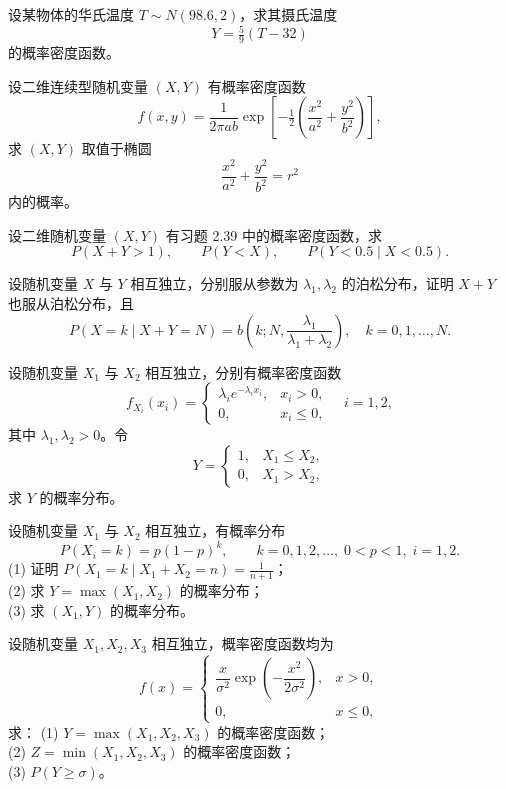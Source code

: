 \begin{homework}[2.45]
设某物体的华氏温度 $T \sim N(98.6, 2)$，求其摄氏温度
\[
Y = \tfrac{5}{9}(T - 32)
\]
的概率密度函数。
\end{homework}

\begin{homework}[2.50]
设二维连续型随机变量 $(X,Y)$ 有概率密度函数
\[
f(x,y) = \frac{1}{2\pi ab} \exp \!\left[ -\tfrac{1}{2} \!\left( \frac{x^2}{a^2} + \frac{y^2}{b^2} \right) \right],
\]
求 $(X,Y)$ 取值于椭圆
\[
\frac{x^2}{a^2} + \frac{y^2}{b^2} = r^2
\]
内的概率。
\end{homework}

\begin{homework}[2.53]
设二维随机变量 $(X,Y)$ 有习题 2.39 中的概率密度函数，求
\[
P(X+Y > 1),\qquad P(Y < X),\qquad P(Y < 0.5 \mid X < 0.5).
\]
\end{homework}

\begin{homework}[2.56]
设随机变量 $X$ 与 $Y$ 相互独立，分别服从参数为 $\lambda_1,\lambda_2$ 的泊松分布，证明 $X+Y$ 也服从泊松分布，且
\[
P(X = k \mid X+Y = N)
 = b\!\left(k;N,\frac{\lambda_1}{\lambda_1+\lambda_2}\right),
\quad k=0,1,\ldots,N.
\]
\end{homework}

\begin{homework}[2.52]
设随机变量 $X_1$ 与 $X_2$ 相互独立，分别有概率密度函数
\[
f_{X_i}(x_i)=
\begin{cases}
\lambda_i e^{-\lambda_i x_i}, & x_i > 0,\\[4pt]
0, & x_i \le 0,
\end{cases}
\quad i=1,2,
\]
其中 $\lambda_1,\lambda_2>0$。令
\[
Y =
\begin{cases}
1, & X_1 \le X_2,\\
0, & X_1 > X_2,
\end{cases}
\]
求 $Y$ 的概率分布。
\end{homework}

\begin{homework}[2.57]
设随机变量 $X_1$ 与 $X_2$ 相互独立，有概率分布
\[
P(X_i = k) = p(1-p)^k,\qquad k = 0,1,2,\ldots,\; 0<p<1,\; i=1,2.
\]
(1) 证明 $P(X_1=k \mid X_1+X_2=n)=\frac{1}{n+1}$；\\
(2) 求 $Y = \max(X_1,X_2)$ 的概率分布；\\
(3) 求 $(X_1,Y)$ 的概率分布。
\end{homework}

\begin{homework}[2.60]
设随机变量 $X_1,X_2,X_3$ 相互独立，概率密度函数均为
\[
f(x)=
\begin{cases}
\dfrac{x}{\sigma^2}\exp\!\left(-\dfrac{x^2}{2\sigma^2}\right), & x>0,\\
0, & x\le0,
\end{cases}
\]
求：  
(1) $Y=\max(X_1,X_2,X_3)$ 的概率密度函数；\\
(2) $Z=\min(X_1,X_2,X_3)$ 的概率密度函数；\\
(3) $P(Y\ge\sigma)$。
\end{homework}

